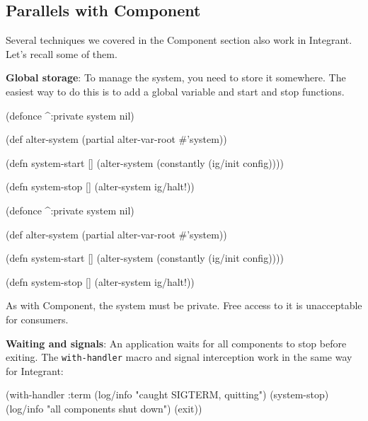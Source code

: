 \subsection{Parallels with Component}

Several techniques we covered in the Component section also work in Integrant. Let's recall some of them.


\textbf{Global storage}: To manage the system, you need to store it somewhere. The easiest way to do this is to add a global variable and start and stop functions.

\ifnarrow

\begin{english}
  \begin{clojure}
(defonce ^:private system nil)

(def alter-system
  (partial alter-var-root #'system))

(defn system-start []
  (alter-system
    (constantly (ig/init config))))

(defn system-stop []
  (alter-system ig/halt!))
  \end{clojure}
\end{english}

\else

\begin{english}
  \begin{clojure}
(defonce ^:private system nil)

(def alter-system (partial alter-var-root #'system))

(defn system-start []
  (alter-system (constantly (ig/init config))))

(defn system-stop []
  (alter-system ig/halt!))
  \end{clojure}
\end{english}

\fi

As with Component, the system must be private. Free access to it is unacceptable for consumers.


\textbf{Waiting and signals}: An application waits for all components to stop before exiting. The \verb|with-handler| macro and signal interception work in the same way for Integrant:

\begin{english}
  \begin{clojure}
(with-handler :term
  (log/info "caught SIGTERM, quitting")
  (system-stop)
  (log/info "all components shut down")
  (exit))
  \end{clojure}
\end{english}

